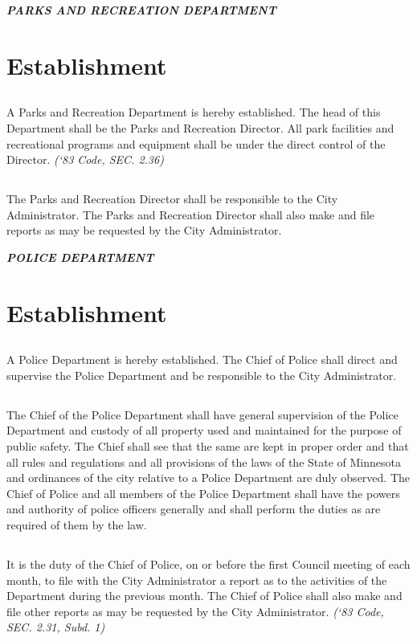 \centerline{\textbf{\emph{\LARGE{PARKS AND RECREATION DEPARTMENT}}}}
\setcounter{section}{59}
\section{Establishment}
\subsection{}
A Parks and Recreation Department is hereby established. The head of this Department shall be the Parks and Recreation Director. All park facilities and recreational programs and equipment shall be under the direct control of the Director.\newline
\emph{(‘83 Code, SEC. 2.36)}
\subsection{}
The Parks and Recreation Director shall be responsible to the City Administrator. The Parks and Recreation Director shall also make and file reports as may be requested by the City Administrator.\newline

\centerline{\textbf{\emph{\LARGE{POLICE DEPARTMENT}}}}
\setcounter{section}{69}
\section{Establishment}
\subsection{}
A Police Department is hereby established. The Chief of Police shall direct and supervise the Police Department and be responsible to the City Administrator.
\subsection{}
The Chief of the Police Department shall have general supervision of the Police Department and custody of all property used and maintained for the purpose of public safety.  The Chief shall see that the same are kept in proper order and that all rules and regulations and all provisions of the laws of the State of Minnesota and ordinances of the city relative to a Police Department are duly observed. The Chief of Police and all members of the Police Department shall have the powers and authority of police officers generally and shall perform the duties as are required of them by the law.
\subsection{}
It is the duty of the Chief of Police, on or before the first Council meeting of each month, to file with the City Administrator a report as to the activities of the Department during the previous month. The Chief of Police shall also make and file other reports as may be requested by the City Administrator.\newline
\emph{(‘83 Code, SEC. 2.31, Subd. 1)}
